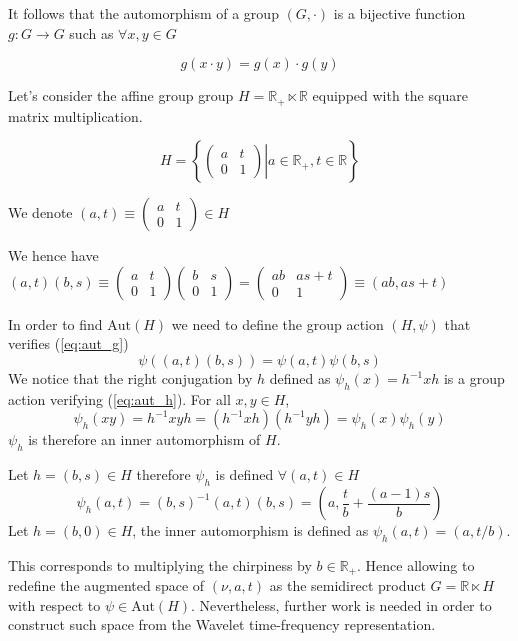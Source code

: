 \documentclass[american,]{article}
\theoremstyle{definition}
\theoremstyle{definition}
\theoremstyle{definition}
\theoremstyle{remark}
\begin{document}
It follows that the automorphism of a group \((G,\cdot)\) is a bijective function
\(g:G\rightarrow G\) such as \(\forall x,y\in G\)

\begin{equation}\label{eq:aut_g}
g(x\cdot y) = g(x)\cdot g(y)
\end{equation}

Let's consider the affine group group \(H=\mathbb{R}_+\ltimes\mathbb{R}\) equipped with the square matrix multiplication.

\begin{equation}
H = \left\{\left.\begin{pmatrix}a & t\\0 & 1\end{pmatrix}\right\vert a\in\mathbb{R}_+, t\in\mathbb{R}\right\}
\end{equation}

We denote \((a,t)\equiv \begin{pmatrix}a & t\\0 & 1\end{pmatrix}\in H\)

We hence have \((a,t)(b,s)\equiv\begin{pmatrix}a & t\\0 & 1\end{pmatrix}\begin{pmatrix}b & s\\0 & 1\end{pmatrix}=\begin{pmatrix}ab & as+t\\0 & 1\end{pmatrix}\equiv(ab,as+t)\)

In order to find \(\mathrm{Aut}(H)\) we need to define the group action \((H,\psi)\) that verifies (\ref{eq:aut_g})
\begin{equation}\label{eq:aut_h}
\psi((a,t)(b,s)) = \psi(a,t)\psi(b,s)
\end{equation}
We notice that the right conjugation by \(h\) defined as \(\psi_h(x)=h^{-1}xh\)
is a group action verifying (\ref{eq:aut_h}). For all \(x,y\in H\),
\begin{equation}
\psi_h(xy)=h^{-1}xy h=(h^{-1}xh)(h^{-1}yh)=\psi_h(x)\psi_h(y)
\end{equation}
\(\psi_h\) is therefore an inner automorphism of \(H\).

Let \(h=(b,s)\in H\) therefore \(\psi_h\) is defined \(\forall(a,t)\in H\)
\begin{equation}
\psi_h(a,t)=(b,s)^{-1}(a,t)(b,s)=\left(a, \frac{t}{b}+\frac{(a-1)s}{b}\right)
\end{equation}
Let \(h=(b,0)\in H\), the inner automorphism is defined as \(\psi_h(a,t)=(a,t/b)\).

This corresponds to multiplying the chirpiness by \(b\in\mathbb{R}_+\).
Hence allowing to redefine the augmented space of \((\nu,a,t)\)
as the semidirect product \(G=\mathbb{R}\ltimes H\) with respect to \(\psi\in\mathrm{Aut}(H)\).
Nevertheless, further work is needed in order to construct such space
from the Wavelet time-frequency representation.
\end{document}
